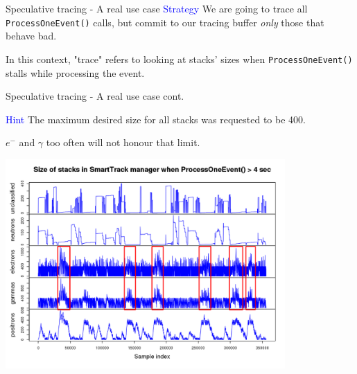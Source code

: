 \documentclass{beamer}
\begin{document}
\begin{frame}{Speculative tracing - A real use case}
\textcolor{blue}{Strategy} We are going to trace all {\tt ProcessOneEvent()} calls, but commit to our tracing
buffer \textit{only} those that behave bad.

\vspace{5mm}

In this context, "trace" refers to looking at stacks' sizes when {\tt ProcessOneEvent()}
stalls while processing the event.

\end{frame}

\begin{frame}{Speculative tracing - A real use case cont.}

\textcolor{blue}{Hint} The maximum desired size for all stacks was requested to be 400.

$e^-$ and $\gamma$ too often will not honour that limit.

\begin{center}
  \includegraphics[width=0.8\textwidth]{pathol-all.png}
\end{center}
\end{frame}
\end{document}
